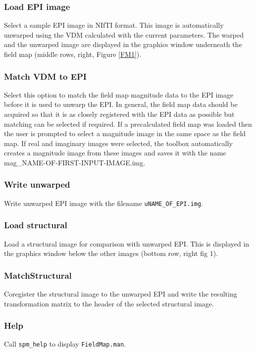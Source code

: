 \subsubsection{Load EPI image}
Select a sample EPI image in NIfTI format. This image is automatically unwarped using the VDM calculated with the current parameters. The warped and the unwarped image are displayed in the graphics window underneath the field map (middle rows, right, Figure \ref{FM1}).

\subsubsection{Match VDM to EPI \label{VDMmatch}}
Select this option to match the field map magnitude data to the EPI image before it is used to unwarp the EPI. In general, the field map data should be acquired so that it is as closely registered with the EPI data as possible but matching can be selected if required. If a precalculated field map was loaded then the user is prompted to select a magnitude image in the same space as the field map. If real and imaginary images were selected, the toolbox automatically creates a magnitude image from these images and saves it with the name mag\_NAME-OF-FIRST-INPUT-IMAGE.img. 

\subsubsection{Write unwarped}
Write unwarped EPI image with the filename \texttt{uNAME\_OF\_EPI.img}.

\subsubsection{Load structural}
Load a structural image for comparison with unwarped EPI. This is displayed in the graphics window below the other images (bottom row, right fig 1).

\subsubsection{MatchStructural}
Coregister the structural image to the unwarped EPI and write the resulting transformation matrix to the header of the selected structural image.

\subsubsection{Help}
Call \texttt{spm\_help} to display \texttt{FieldMap.man}.

